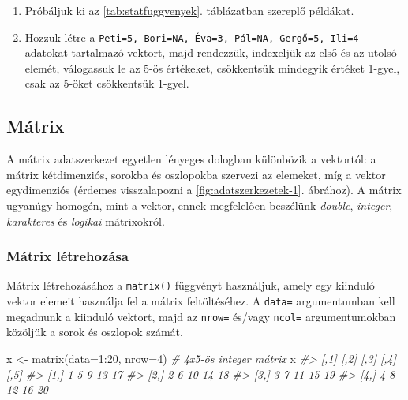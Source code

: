 \documentclass[
]{book}
\makeatletter
\newenvironment{Shaded}{\begin{snugshade}}{\end{snugshade}}
\newcommand{\AttributeTok}[1]{\textcolor[rgb]{0.77,0.63,0.00}{#1}}
\newcommand{\CommentTok}[1]{\textcolor[rgb]{0.56,0.35,0.01}{\textit{#1}}}
\newcommand{\DecValTok}[1]{\textcolor[rgb]{0.00,0.00,0.81}{#1}}
\newcommand{\FunctionTok}[1]{\textcolor[rgb]{0.00,0.00,0.00}{#1}}
\newcommand{\NormalTok}[1]{#1}
\newcommand{\OtherTok}[1]{\textcolor[rgb]{0.56,0.35,0.01}{#1}}
\newcommand{\SpecialCharTok}[1]{\textcolor[rgb]{0.00,0.00,0.00}{#1}}
\newenvironment{kframe}{%
\medskip{}
\setlength{\fboxsep}{.8em}
 \def\at@end@of@kframe{}%
 \ifinner\ifhmode%
  \def\at@end@of@kframe{\end{minipage}}%
  \begin{minipage}{\columnwidth}%
 \fi\fi%
 \def\FrameCommand##1{\hskip\@totalleftmargin \hskip-\fboxsep
 \colorbox{shadecolor}{##1}\hskip-\fboxsep
     \hskip-\linewidth \hskip-\@totalleftmargin \hskip\columnwidth}%
 \MakeFramed {\advance\hsize-\width
   \@totalleftmargin\z@ \linewidth\hsize
   \@setminipage}}%
 {\par\unskip\endMakeFramed%
 \at@end@of@kframe}
\newenvironment{rmdblock}[1]
  {
  \begin{itemize}
  \renewcommand{\labelitemi}{
    \raisebox{-.7\height}[0pt][0pt]{
      {\setkeys{Gin}{width=3em,keepaspectratio}\texttt{[image: images/\#1]}}
    }
  }
  \setlength{\fboxsep}{1em}
  \begin{kframe}
  \item
  }
  {
  \end{kframe}
  \end{itemize}
  }
\newenvironment{rmdexercise}
  {\begin{rmdblock}{exercise}}
  {\end{rmdblock}}
\makeatother
\begin{document}
\begin{rmdexercise}
\begin{enumerate}
\item
  Próbáljuk ki az \ref{tab:statfuggvenyek}. táblázatban szereplő példákat.
\item
  Hozzuk létre a \texttt{\textquotesingle{}Peti\textquotesingle{}=5,\ \textquotesingle{}Bori\textquotesingle{}=NA,\ \textquotesingle{}Éva\textquotesingle{}=3,\ \textquotesingle{}Pál\textquotesingle{}=NA,\ \textquotesingle{}Gergő\textquotesingle{}=5,\ \textquotesingle{}Ili\textquotesingle{}=4} adatokat tartalmazó vektort, majd rendezzük, indexeljük az első és az utolsó elemét, válogassuk le az 5-ös értékeket, csökkentsük mindegyik értéket 1-gyel, csak az 5-öket csökkentsük 1-gyel.
\end{enumerate}
\end{rmdexercise}

\hypertarget{muxe1trix}{%
\subsection{Mátrix}\label{muxe1trix}}

A mátrix adatszerkezet egyetlen lényeges dologban különbözik a vektortól: a mátrix kétdimenziós, sorokba és oszlopokba szervezi az elemeket, míg a vektor egydimenziós (érdemes visszalapozni a \ref{fig:adatszerkezetek-1}. ábrához). A mátrix ugyanúgy homogén, mint a vektor, ennek megfelelően beszélünk \emph{double}, \emph{integer}, \emph{karakteres} és \emph{logikai} mátrixokról.

\hypertarget{muxe1trix-luxe9trehozuxe1sa}{%
\subsubsection{Mátrix létrehozása}\label{muxe1trix-luxe9trehozuxe1sa}}

Mátrix létrehozásához a \texttt{matrix()} függvényt használjuk, amely egy kiinduló vektor elemeit használja fel a mátrix feltöltéséhez. A \texttt{data=} argumentumban kell megadnunk a kiinduló vektort, majd az \texttt{nrow=} és/vagy \texttt{ncol=} argumentumokban közöljük a sorok és oszlopok számát.

\begin{Shaded}
\begin{Highlighting}[]
\NormalTok{x }\OtherTok{\textless{}{-}} \FunctionTok{matrix}\NormalTok{(}\AttributeTok{data=}\DecValTok{1}\SpecialCharTok{:}\DecValTok{20}\NormalTok{, }\AttributeTok{nrow=}\DecValTok{4}\NormalTok{)        }\CommentTok{\# 4x5{-}ös integer mátrix}
\NormalTok{x}
\CommentTok{\#\textgreater{}      [,1] [,2] [,3] [,4] [,5]}
\CommentTok{\#\textgreater{} [1,]    1    5    9   13   17}
\CommentTok{\#\textgreater{} [2,]    2    6   10   14   18}
\CommentTok{\#\textgreater{} [3,]    3    7   11   15   19}
\CommentTok{\#\textgreater{} [4,]    4    8   12   16   20}
\end{Highlighting}
\end{Shaded}
\end{document}

